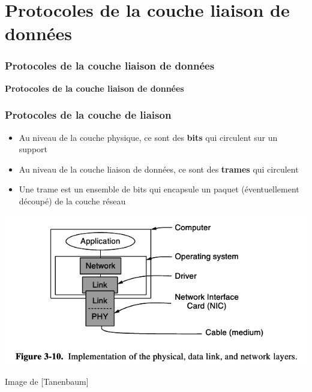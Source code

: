 \section{Protocoles de la couche liaison de données}

\begin{frame}[fragile]
	\frametitle{Protocoles de la couche liaison de données}
\begin{center}
	\Huge{\bf\color{blue}Protocoles de la couche liaison de données}
\end{center}
\begin{flushright}
\end{flushright}
\end{frame}

\begin{frame}[fragile]
  \frametitle{ Protocoles de la couche de liaison}
\begin{itemize}
	\item Au niveau de la couche physique, ce sont des \textbf{bits} qui circulent sur un support
	\item Au niveau de la couche liaison de données, ce sont des \textbf{trames} qui circulent
	\item Une trame est un ensemble de bits qui encapsule un paquet (éventuellement découpé) de la couche réseau
\end{itemize}
\begin{center}
	\includegraphics[width=.53\linewidth]{img/3-10.png}
	\par{\scriptsize Image de [Tanenbaum]} 
\end{center}
\end{frame}


